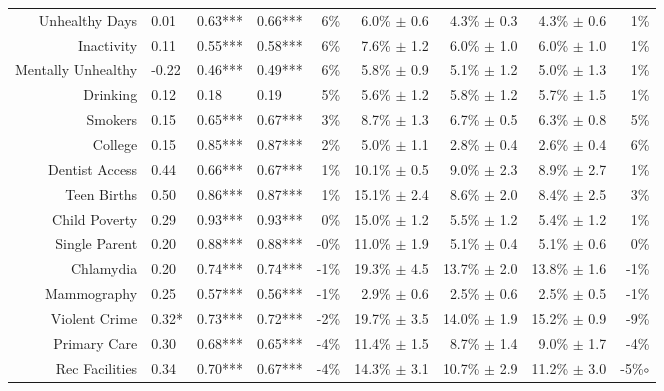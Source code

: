 \begin{table*}[t]
\begin{tabular}{|r|l|l|l|r||r|r|r|r|}
                Unhealthy Days 	 & 0.01 	 & 0.63*** 	 & 0.66*** 	 & 6\% 	 & 6.0\% $\pm$ 0.6 	 & 4.3\% $\pm$ 0.3 	 & 4.3\% $\pm$ 0.6 	 & 1\%\\
                    Inactivity 	 & 0.11 	 & 0.55*** 	 & 0.58*** 	 & 6\% 	 & 7.6\% $\pm$ 1.2 	 & 6.0\% $\pm$ 1.0 	 & 6.0\% $\pm$ 1.0 	 & 1\%\\
            Mentally Unhealthy 	 & -0.22 	 & 0.46*** 	 & 0.49*** 	 & 6\% 	 & 5.8\% $\pm$ 0.9 	 & 5.1\% $\pm$ 1.2 	 & 5.0\% $\pm$ 1.3 	 & 1\%\\
                      Drinking 	 & 0.12 	 & 0.18 	 & 0.19 	 & 5\% 	 & 5.6\% $\pm$ 1.2 	 & 5.8\% $\pm$ 1.2 	 & 5.7\% $\pm$ 1.5 	 & 1\%\\
                       Smokers 	 & 0.15 	 & 0.65*** 	 & 0.67*** 	 & 3\% 	 & 8.7\% $\pm$ 1.3 	 & 6.7\% $\pm$ 0.5 	 & 6.3\% $\pm$ 0.8 	 & 5\%\\
                       College 	 & 0.15 	 & 0.85*** 	 & 0.87*** 	 & 2\% 	 & 5.0\% $\pm$ 1.1 	 & 2.8\% $\pm$ 0.4 	 & 2.6\% $\pm$ 0.4 	 & 6\%\\
                Dentist Access 	 & 0.44 	 & 0.66*** 	 & 0.67*** 	 & 1\% 	 & 10.1\% $\pm$ 0.5 	 & 9.0\% $\pm$ 2.3 	 & 8.9\% $\pm$ 2.7 	 & 1\%\\
                   Teen Births 	 & 0.50 	 & 0.86*** 	 & 0.87*** 	 & 1\% 	 & 15.1\% $\pm$ 2.4 	 & 8.6\% $\pm$ 2.0 	 & 8.4\% $\pm$ 2.5 	 & 3\%\\
                 Child Poverty 	 & 0.29 	 & 0.93*** 	 & 0.93*** 	 & 0\% 	 & 15.0\% $\pm$ 1.2 	 & 5.5\% $\pm$ 1.2 	 & 5.4\% $\pm$ 1.2 	 & 1\%\\
                 Single Parent 	 & 0.20 	 & 0.88*** 	 & 0.88*** 	 & -0\% 	 & 11.0\% $\pm$ 1.9 	 & 5.1\% $\pm$ 0.4 	 & 5.1\% $\pm$ 0.6 	 & 0\%\\
                     Chlamydia 	 & 0.20 	 & 0.74*** 	 & 0.74*** 	 & -1\% 	 & 19.3\% $\pm$ 4.5 	 & 13.7\% $\pm$ 2.0 	 & 13.8\% $\pm$ 1.6 	 & -1\%\\
                   Mammography 	 & 0.25 	 & 0.57*** 	 & 0.56*** 	 & -1\% 	 & 2.9\% $\pm$ 0.6 	 & 2.5\% $\pm$ 0.6 	 & 2.5\% $\pm$ 0.5 	 & -1\%\\
                 Violent Crime 	 & 0.32* 	 & 0.73*** 	 & 0.72*** 	 & -2\% 	 & 19.7\% $\pm$ 3.5 	 & 14.0\% $\pm$ 1.9 	 & 15.2\% $\pm$ 0.9 	 & -9\%\\
                  Primary Care 	 & 0.30 	 & 0.68*** 	 & 0.65*** 	 & -4\% 	 & 11.4\% $\pm$ 1.5 	 & 8.7\% $\pm$ 1.4 	 & 9.0\% $\pm$ 1.7 	 & -4\%\\
                Rec Facilities 	 & 0.34 	 & 0.70*** 	 & 0.67*** 	 & -4\% 	 & 14.3\% $\pm$ 3.1 	 & 10.7\% $\pm$ 2.9 	 & 11.2\% $\pm$ 3.0 	 & -5\%$\circ$\\

\end{tabular}
\end{table*}
